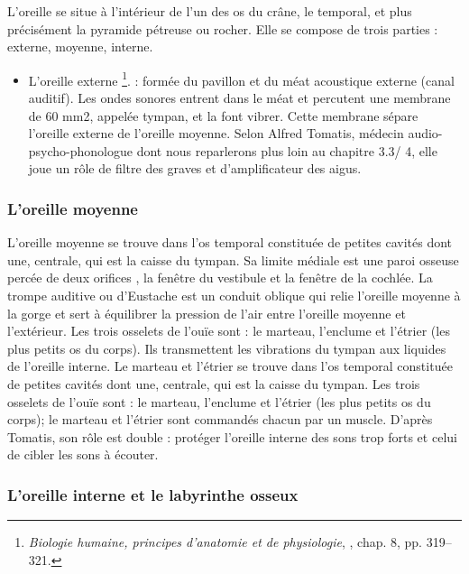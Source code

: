 L'oreille\autocite[ch. 8 pp. 319--321]{marieb:biologie} 
se situe à l'intérieur de l'un des os du crâne, le temporal, et plus précisément la pyramide pétreuse ou rocher. Elle se compose de trois parties : externe, moyenne, interne.
\begin{itemize}
	\item  L'oreille externe \footnote{\textsl{Biologie humaine, principes d'anatomie et de physiologie}, \cite{marieb:biologie}, chap. 8, pp. 319--321.}.
	: formée du pavillon et du méat acoustique externe
	(canal auditif). Les ondes sonores entrent dans le méat et percutent
	une membrane de 60 mm2, appelée tympan, et la font vibrer. Cette membrane
	sépare l'oreille externe de l'oreille moyenne. 
	Selon Alfred Tomatis, médecin audio-psycho-phonologue dont nous reparlerons plus loin au chapitre 3.3/ 4, elle
	joue un rôle de filtre des graves et d'amplificateur des aigus.
\end{itemize}



\subsubsection{L'oreille moyenne}

L'oreille moyenne se trouve dans l'os temporal constituée de petites
cavités dont une, centrale, qui est la caisse du tympan. Sa limite
médiale est une paroi osseuse percée de deux orifices , la fenêtre
du vestibule et la fenêtre de la cochlée. La trompe auditive ou d'Eustache
est un conduit oblique qui relie l'oreille moyenne à la gorge et sert
à équilibrer la pression de l'air entre l'oreille moyenne et l'extérieur.
Les trois osselets de l'ouïe sont : le marteau, l'enclume et l'étrier
(les plus petits os du corps). Ils transmettent les vibrations du
tympan aux liquides de l'oreille interne. Le marteau et l'étrier se
trouve dans l'os temporal constituée de petites cavités dont une,
centrale, qui est la caisse du tympan. Les trois osselets de l'ouïe
sont : le marteau, l'enclume et l'étrier (les plus petits os du corps);
le marteau et l'étrier sont commandés chacun par un muscle. D'après
Tomatis, son rôle est double : protéger l'oreille interne des sons
trop forts et celui de cibler les sons à écouter.

\subsubsection{L'oreille interne et le labyrinthe osseux}

